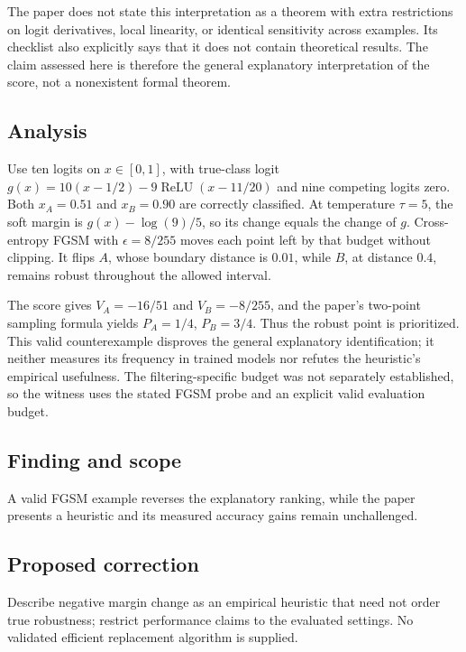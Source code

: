 \documentclass[11pt]{article}
\begin{document}
The paper does not state this interpretation as a theorem with extra restrictions on logit derivatives, local linearity, or identical sensitivity across examples. Its checklist also explicitly says that it does not contain theoretical results. The claim assessed here is therefore the general explanatory interpretation of the score, not a nonexistent formal theorem.

\subsection*{Analysis}

Use ten logits on \(x\in[0,1]\), with true-class logit \(g(x)=10(x-1/2)-9\operatorname{ReLU}(x-11/20)\) and nine competing logits zero. Both \(x_A=0.51\) and \(x_B=0.90\) are correctly classified. At temperature \(\tau=5\), the soft margin is \(g(x)-\log(9)/5\), so its change equals the change of \(g\). Cross-entropy FGSM with \(\epsilon=8/255\) moves each point left by that budget without clipping. It flips \(A\), whose boundary distance is \(0.01\), while \(B\), at distance \(0.4\), remains robust throughout the allowed interval.

The score gives \(V_A=-16/51\) and \(V_B=-8/255\), and the paper’s two-point sampling formula yields \(P_A=1/4\), \(P_B=3/4\). Thus the robust point is prioritized. This valid counterexample disproves the general explanatory identification; it neither measures its frequency in trained models nor refutes the heuristic’s empirical usefulness. The filtering-specific budget was not separately established, so the witness uses the stated FGSM probe and an explicit valid evaluation budget.

\subsection*{Finding and scope}

A valid FGSM example reverses the explanatory ranking, while the paper presents a heuristic and its measured accuracy gains remain unchallenged.

\subsection*{Proposed correction}

Describe negative margin change as an empirical heuristic that need not order true robustness; restrict performance claims to the evaluated settings. No validated efficient replacement algorithm is supplied.
\end{document}
